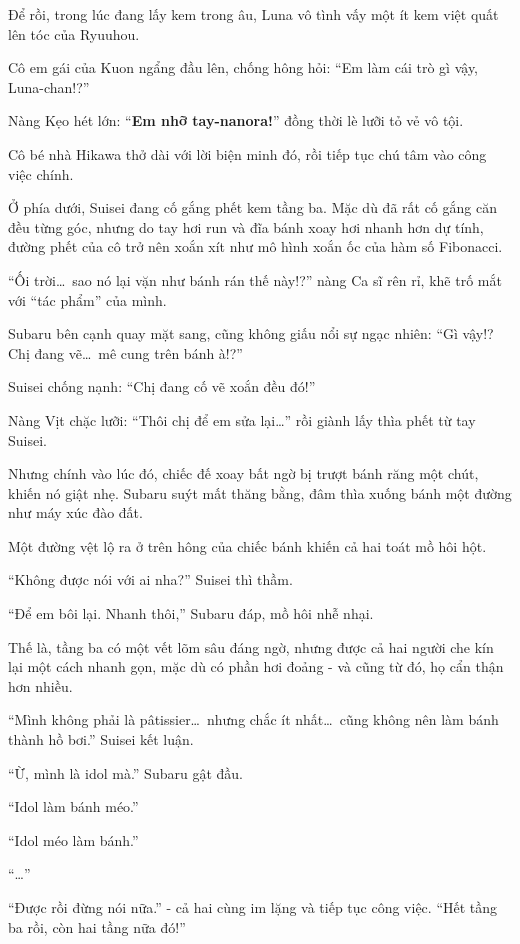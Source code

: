 \documentclass[../main.tex]{subfiles}
\begin{document}
Để rồi, trong lúc đang lấy kem trong âu, Luna vô tình vấy một ít kem việt quất lên tóc của Ryuuhou.

Cô em gái của Kuon ngẩng đầu lên, chống hông hỏi: ``Em làm cái trò gì vậy, Luna-chan!?''

Nàng Kẹo hét lớn: ``\textbf{Em nhỡ tay-nanora!}'' đồng thời lè lưỡi tỏ vẻ vô tội.

Cô bé nhà Hikawa thở dài với lời biện minh đó, rồi tiếp tục chú tâm vào công việc chính.

Ở phía dưới, Suisei đang cố gắng phết kem tầng ba. Mặc dù đã rất cố gắng căn đều từng góc, nhưng do tay hơi run và đĩa bánh xoay hơi nhanh hơn dự tính, đường phết của cô trở nên xoắn xít như mô hình xoắn ốc của hàm số Fibonacci.

``Ối trời\dots\ sao nó lại vặn như bánh rán thế này!?'' nàng Ca sĩ rên rỉ, khẽ trố mắt với ``tác phẩm'' của mình.

Subaru bên cạnh quay mặt sang, cũng không giấu nổi sự ngạc nhiên: ``Gì vậy!? Chị đang vẽ\dots\ mê cung trên bánh à!?''

Suisei chống nạnh: ``Chị đang cố vẽ xoắn đều đó!''

Nàng Vịt chặc lưỡi: ``Thôi chị để em sửa lại\dots'' rồi giành lấy thìa phết từ tay Suisei.

Nhưng chính vào lúc đó, chiếc đế xoay bất ngờ bị trượt bánh răng một chút, khiến nó giật nhẹ. Subaru suýt mất thăng bằng, đâm thìa xuống bánh một đường như máy xúc đào đất.

Một đường vệt lộ ra ở trên hông của chiếc bánh khiến cả hai toát mồ hôi hột.

``Không được nói với ai nha?'' Suisei thì thầm.

``Để em bôi lại. Nhanh thôi,'' Subaru đáp, mồ hôi nhễ nhại.

Thế là, tầng ba có một vết lõm sâu đáng ngờ, nhưng được cả hai người che kín lại một cách nhanh gọn, mặc dù có phần hơi đoảng - và cũng từ đó, họ cẩn thận hơn nhiều.

``Mình không phải là pâtissier\dots\ nhưng chắc ít nhất\dots\ cũng không nên làm bánh thành hồ bơi.'' Suisei kết luận.

``Ừ, mình là idol mà.'' Subaru gật đầu.

``Idol làm bánh méo.''

``Idol méo làm bánh.''

``\dots''

``Được rồi đừng nói nữa.'' - cả hai cùng im lặng và tiếp tục công việc. ``Hết tầng ba rồi, còn hai tầng nữa đó!''
\end{document}
